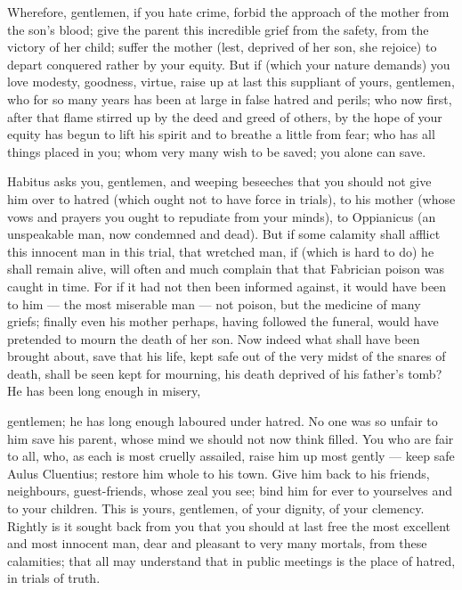  Wherefore, gentlemen, if you hate crime, forbid the approach of the mother from the son's blood; give the parent this incredible grief from the safety, from the victory of her child; suffer the mother (lest, deprived of her son, she rejoice) to depart conquered rather by your equity. But if (which your nature demands) you love modesty, goodness, virtue, raise up at last this suppliant of yours, gentlemen, who for so many years has been at large in false hatred and perils; who now first, after that flame stirred up by the deed and greed of others, by the hope of your equity has begun to lift his spirit and to breathe a little from fear; who has all things placed in you; whom very many wish to be saved; you alone can save.

 Habitus asks you, gentlemen, and weeping beseeches that you should not give him over to hatred (which ought not to have force in trials), to his mother (whose vows and prayers you ought to repudiate from your minds), to Oppianicus (an unspeakable man, now condemned and dead). But if some calamity shall afflict this innocent man in this trial, that wretched man, if (which is hard to do) he shall remain alive, will often and much complain that that Fabrician poison was caught in time. For if it had not then been informed against, it would have been to him --- the most miserable man --- not poison, but the medicine of many griefs; finally even his mother perhaps, having followed the funeral, would have pretended to mourn the death of her son. Now indeed what shall have been brought about, save that his life, kept safe out of the very midst of the snares of death, shall be seen kept for mourning, his death deprived of his father's tomb? He has been long enough in misery,

 gentlemen; he has long enough laboured under hatred. No one was so unfair to him save his parent, whose mind we should not now think filled. You who are fair to all, who, as each is most cruelly assailed, raise him up most gently --- keep safe Aulus Cluentius; restore him whole to his town. Give him back to his friends, neighbours, guest-friends, whose zeal you see; bind him for ever to yourselves and to your children. This is yours, gentlemen, of your dignity, of your clemency. Rightly is it sought back from you that you should at last free the most excellent and most innocent man, dear and pleasant to very many mortals, from these calamities; that all may understand that in public meetings is the place of hatred, in trials of truth.

